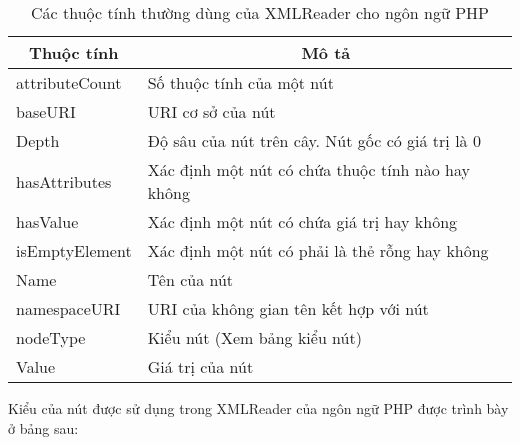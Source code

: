 \begin{center}
\begin{longtable}{|m{3cm}|m{8cm}|}
\caption[Các thuộc tính thường dùng của XMLReader cho ngôn ngữ PHP]{Các thuộc tính thường dùng của XMLReader cho ngôn ngữ PHP}
 \endfirsthead
 \endhead
\hline
\multicolumn{1}{|c|}{ \textbf{Thuộc tính}} &	\multicolumn{1}{c|}{ \textbf{Mô tả}}\\ \hline
attributeCount &	Số thuộc tính của một nút\\ \hline
baseURI &	URI cơ sở của nút\\ \hline
Depth &	Độ sâu của nút trên cây. Nút gốc có giá trị là 0\\ \hline
hasAttributes &	Xác định một nút có chứa thuộc tính nào hay không\\ \hline
hasValue &	Xác định một nút có chứa giá trị hay không\\ \hline
isEmptyElement &	Xác định một nút có phải là thẻ rỗng hay không\\ \hline
Name &	Tên của nút\\ \hline
namespaceURI &	URI của không gian tên kết hợp với nút\\ \hline
nodeType &	Kiểu nút (Xem bảng kiểu nút) \\ \hline
Value &	Giá trị của nút\\ \hline

\end{longtable}
\end{center}
\vspace{-1cm}
Kiểu của nút được sử dụng trong XMLReader của ngôn ngữ PHP được trình bày ở bảng sau: 

